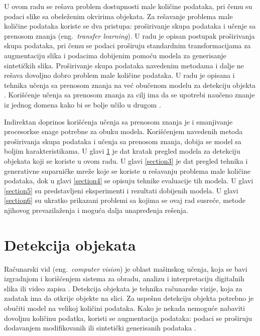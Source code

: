 \documentclass[12pt,oneside]{memoir}
\begin{document}
U ovom radu se rešava problem dostupnosti male količine podataka, pri čemu su podaci slike sa obeleženim okvirima objekata. Za rešavanje problema male količine podataka koriste se dva pristupa: proširivanje skupa podataka i učenje sa prenosom znanja (eng.~\textit{transfer learning}).
U radu je opisan postupak proširivanja skupa podataka, pri čemu se podaci proširuju standardnim transformacijama za augmentaciju slika i podacima dobijenim pomoću modela za generisanje sintetičkih slika.
Proširivanje skupa podataka navedenim metodama i dalje ne rešava dovoljno dobro problem male količine podataka. 
U radu je opisana i tehnika učenja sa prenosom znanja \cite{zhuang2020comprehensive} na već obučenom modelu za detekciju objekta \cite{bochkovskiy2020yolov4}. 
Korišćenje učenja sa prenosom znanja za cilj ima da se upotrebi naučeno znanje iz jednog domena kako bi se bolje učilo u drugom \cite{brigato2021close, bengio2012deep}.

Indirektan doprinos korišćenja učenja sa prenosom znanja je i smanjivanje procesorkse snage potrebne za obuku modela.
Korišćenjem navedenih metoda proširivanja skupa podataka i učenja sa prenosom znanja, dobija se model sa boljim karakteristikama.
U glavi \ref{section2} je dat kratak pregled modela za detekciju objekata koji se koriste u ovom radu. U glavi \ref{section3} je dat pregled tehnika i generativne suparničke mreže koje se koriste u rešavanju problema male količine podataka, dok u glavi \ref{section4} se opisuju tehnike evaluacije tih modela. U glavi \ref{section5} su predstavljeni eksperimenti i rezultati dobijenih modela. U glavi \ref{section6} su ukratko prikazani problemi sa kojima se ovaj rad susreće, metode njihovog prevazilaženja i moguća dalja unapređenja rešenja.


\chapter{Detekcija objekata}
\label{section2}
Računarski vid (eng.~\textit{computer vision}) je oblast mašinskog učenja, koja se bavi izgradnjom i korišćenjem  sistema za obradu, analizu i interpretaciju digitalnih slika ili video zapisa \cite{ballard1982computer, huang1996computer}.
Detekcija objekata je tehnika računarske vizije, koja za zadatak ima 
da otkrije objekte na slici. Za uspešnu detekciju objekta potrebno je obučiti model na velikoj količini podataka. 
Kako je nekada nemoguće nabaviti dovoljnu količinu podatka, koristi se augmentacija podataka: podaci se proširuju dodavanjem modifikovanih ili sintetički generisanih podataka \cite{shorten2019survey}. 
\end{document}
